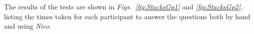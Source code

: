 \documentclass[12pt,twoside,notitlepage,xetex]{report}
\begin{document}
The results of the tests are shown in \emph{Figs.~\ref{fig:StacksGp1}} and \emph{\ref{fig:StacksGp2}}, listing the times taken for each participant to answer the questions both by hand and using \emph{Nico}.

\end{document}
